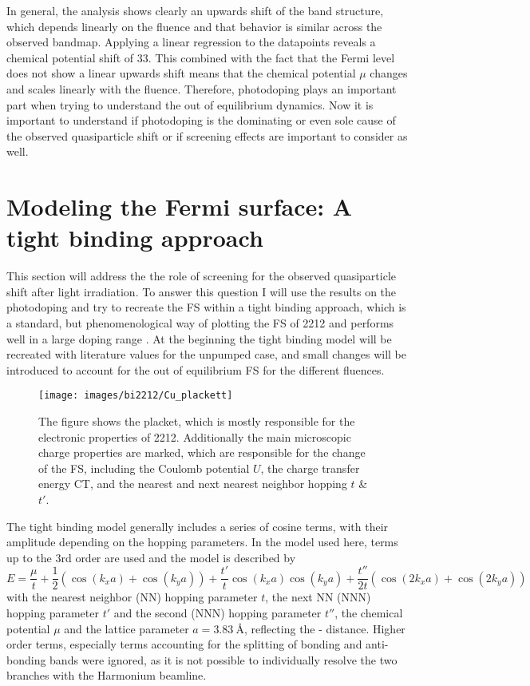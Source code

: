 In general, the analysis shows clearly an upwards shift of the band structure, which depends linearly on the fluence and that behavior is similar across the observed bandmap.
Applying a linear regression to the datapoints reveals a chemical potential shift of \qty{33}{\frac{\milli\electronvolt}{\milli\joule/\centi\meter\squared}}.
This combined with the fact that the Fermi level does not show a linear upwards shift means that the chemical potential $\mu$ changes and scales linearly with the fluence.
Therefore, photodoping plays an important part when trying to understand the out of equilibrium dynamics.
Now it is important to understand if photodoping is the dominating or even sole cause of the observed quasiparticle shift or if screening effects are important to consider as well.

\section{Modeling the Fermi surface: A tight binding approach}
\label{sec:tb}

This section will address the the role of screening for the observed quasiparticle shift after light irradiation.
To answer this question I will use the results on the photodoping and try to recreate the FS within a tight binding approach, which is a standard, but phenomenological way of plotting the FS of 2212 and performs well in a large doping range \cite{markiewicz_one-band_2005}.
At the beginning the tight binding model will be recreated with literature values for the unpumped case, and small changes will be introduced to account for the out of equilibrium FS for the different fluences.

\begin{figure}
	\centering
	\texttt{[image: images/bi2212/Cu\_plackett]}
	\caption{The figure shows the  placket, which is mostly responsible for the electronic properties of 2212. Additionally the main microscopic charge properties are marked, which are responsible for the change of the FS, including the Coulomb potential $U$, the charge transfer energy CT, and the nearest and next nearest neighbor hopping $t$ \& $t'$.}
	\label{fig:cuplackett}
\end{figure}

The tight binding model generally includes a series of cosine terms, with their amplitude depending on the hopping parameters.
In the model used here, terms up to the 3rd order are used and the model is described by
\begin{equation}
	E = \frac{\mu}{t} + \frac{1}{2} \left(\cos(k_xa)+\cos(k_ya)\right) + \frac{t'}{t} \cos(k_xa)\cos(k_ya) + \frac{t''}{2t} \left(\cos(2k_xa)+\cos(2k_ya)\right)
\end{equation}
with the nearest neighbor (NN) hopping parameter $t$, the next NN (NNN) hopping parameter $t'$ and the second (NNN) hopping parameter $t''$, the chemical potential $\mu$ and the lattice parameter $a=\qty{3.83}{\angstrom}$, reflecting the - distance.
Higher order terms, especially terms accounting for the splitting of bonding and anti-bonding bands were ignored, as it is not possible to individually resolve the two branches with the Harmonium beamline.


